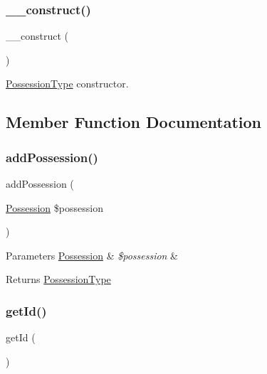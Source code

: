 \subsubsection{\texorpdfstring{\_\_construct()}{\_\_construct()}}
{\footnotesize\ttfamily \+\_\+\+\_\+construct (\begin{DoxyParamCaption}{ }\end{DoxyParamCaption})}

\mbox{\hyperlink{class_app_1_1_entity_1_1_possession_type}{Possession\+Type}} constructor. 

\subsection{Member Function Documentation}
\mbox{\label{class_app_1_1_entity_1_1_possession_type_a5188d786a9c3e2f2936d783276947acc}} 
\subsubsection{\texorpdfstring{addPossession()}{addPossession()}}
{\footnotesize\ttfamily add\+Possession (\begin{DoxyParamCaption}\item[{\mbox{\hyperlink{class_app_1_1_entity_1_1_possession}{Possession}}}]{\$possession }\end{DoxyParamCaption})}


\begin{DoxyParams}[1]{Parameters}
\mbox{\hyperlink{class_app_1_1_entity_1_1_possession}{Possession}} & {\em \$possession} & \\
\hline
\end{DoxyParams}
\begin{DoxyReturn}{Returns}
\mbox{\hyperlink{class_app_1_1_entity_1_1_possession_type}{Possession\+Type}} 
\end{DoxyReturn}
\mbox{\label{class_app_1_1_entity_1_1_possession_type_a12251d0c022e9e21c137a105ff683f13}} 
\subsubsection{\texorpdfstring{getId()}{getId()}}
{\footnotesize\ttfamily get\+Id (\begin{DoxyParamCaption}{ }\end{DoxyParamCaption})}

